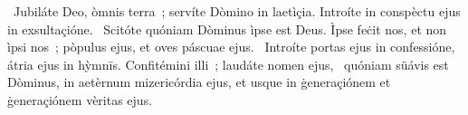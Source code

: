 \psalmChapterWithInscription{}
{ }
{%
~Jubiláte Deo, òmnis terra~; servíte Dòmino in laetìçia. Introíte in conspèctu ejus in exsultaçióne. 
~Scitóte quóniam Dòminus ìpse est Deus. Ìpse feċit nos, et non ìpsi nos~; pòpulus ejus, et oves páscuae ejus. 
~Introíte portas ejus in confessióne, átria ejus in hỳmnïs. Confitémini illi~; laudáte nomen ejus, 
~quóniam süávis est Dòminus, in aetèrnum mizericórdia ejus, et usque in ġeneraçiónem et ġeneraçiónem vèritas ejus. 
}
